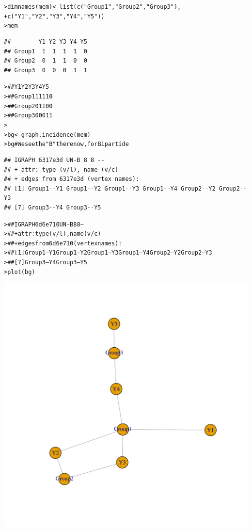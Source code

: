 \documentclass[12pt]{article}\usepackage[]{graphicx}\usepackage[]{color}
\makeatletter
\newcommand{\hlstr}[1]{\textcolor[rgb]{0.82,0.78,0.62}{#1}}%
\newcommand{\hlcom}[1]{\textcolor[rgb]{0.404,0.408,0.42}{#1}}%
\newcommand{\hlstd}[1]{\textcolor[rgb]{0.882,0.878,0.898}{#1}}%
\newcommand{\hlkwb}[1]{\textcolor[rgb]{0.902,0.675,0.196}{#1}}%
\newcommand{\hlkwd}[1]{\textcolor[rgb]{0.733,0.388,0.812}{#1}}%
\newenvironment{kframe}{%
 \def\at@end@of@kframe{}%
 \ifinner\ifhmode%
  \def\at@end@of@kframe{\end{minipage}}%
  \begin{minipage}{\columnwidth}%
 \fi\fi%
 \def\FrameCommand##1{\hskip\@totalleftmargin \hskip-\fboxsep
 \colorbox{shadecolor}{##1}\hskip-\fboxsep
     \hskip-\linewidth \hskip-\@totalleftmargin \hskip\columnwidth}%
 \MakeFramed {\advance\hsize-\width
   \@totalleftmargin\z@ \linewidth\hsize
   \@setminipage}}%
 {\par\unskip\endMakeFramed%
 \at@end@of@kframe}
\newenvironment{knitrout}{}{} %
\makeatother
\begin{document}
\begin{flushleft}
\begin{center}
\begin{knitrout}
\begin{kframe}
\begin{alltt}
\hlstd{> }\hlkwd{dimnames}\hlstd{(mem)} \hlkwb{<-} \hlkwd{list}\hlstd{(}\hlkwd{c}\hlstd{(}\hlstr{"Group1"}\hlstd{,}\hlstr{"Group2"}\hlstd{,}\hlstr{"Group3"}\hlstd{),}
\hlstd{+ }                      \hlkwd{c}\hlstd{(}\hlstr{"Y1"}\hlstd{,}\hlstr{"Y2"}\hlstd{,}\hlstr{"Y3"}\hlstd{,}\hlstr{"Y4"}\hlstd{,}\hlstr{"Y5"}\hlstd{))}
\hlstd{> }\hlstd{mem}
\end{alltt}
\begin{verbatim}
##        Y1 Y2 Y3 Y4 Y5
## Group1  1  1  1  1  0
## Group2  0  1  1  0  0
## Group3  0  0  0  1  1
\end{verbatim}
\begin{alltt}
\hlstd{> }\hlcom{##        Y1 Y2 Y3 Y4 Y5}
\hlstd{> }\hlcom{## Group1  1  1  1  1  0}
\hlstd{> }\hlcom{## Group2  0  1  1  0  0}
\hlstd{> }\hlcom{## Group3  0  0  0  1  1}
\hlstd{> }
\hlstd{> }\hlstd{bg} \hlkwb{<-} \hlkwd{graph.incidence}\hlstd{(mem)}
\hlstd{> }\hlstd{bg}  \hlcom{# We see the "B" there now, for Bipartide}
\end{alltt}
\begin{verbatim}
## IGRAPH 6317e3d UN-B 8 8 -- 
## + attr: type (v/l), name (v/c)
## + edges from 6317e3d (vertex names):
## [1] Group1--Y1 Group1--Y2 Group1--Y3 Group1--Y4 Group2--Y2 Group2--Y3
## [7] Group3--Y4 Group3--Y5
\end{verbatim}
\begin{alltt}
\hlstd{> }\hlcom{## IGRAPH 6d6e710 UN-B 8 8 --}
\hlstd{> }\hlcom{## + attr: type (v/l), name (v/c)}
\hlstd{> }\hlcom{## + edges from 6d6e710 (vertex names):}
\hlstd{> }\hlcom{## [1] Group1--Y1 Group1--Y2 Group1--Y3 Group1--Y4 Group2--Y2 Group2--Y3}
\hlstd{> }\hlcom{## [7] Group3--Y4 Group3--Y5}
\hlstd{> }\hlkwd{plot}\hlstd{(bg)}
\end{alltt}
\end{kframe}
\includegraphics[width=6in]{figure/Network_Basics-5} 

\end{knitrout}
\end{center}
\end{flushleft}
\end{document}
